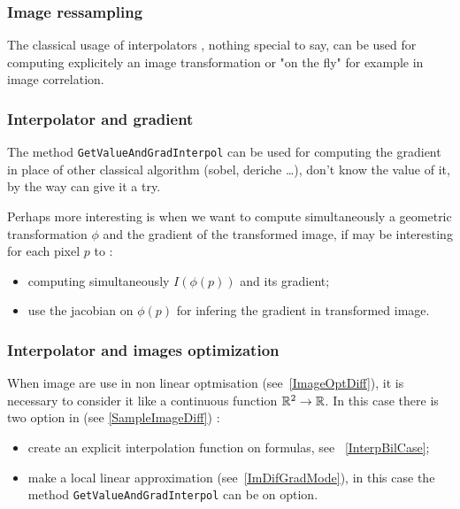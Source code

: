 
\subsubsection{Image ressampling}

The classical usage of interpolators , nothing special to say, can be used for computing explicitely 
an image transformation or "on the fly" for example in image correlation.


\subsubsection{Interpolator and gradient}

The method {\tt GetValueAndGradInterpol} can be used for computing the gradient in place
of other classical algorithm (sobel, deriche \dots), don't know the value of it, by the way
can give it a try.

Perhaps more interesting is when we want to compute simultaneously a geometric transformation $\phi$
and the gradient of the transformed image, if may be interesting for each pixel $p$ to :

\begin{itemize}
   \item computing simultaneously $I(\phi(p))$ and its gradient;
   \item use the jacobian on $\phi(p)$ for infering the gradient in transformed image.
\end{itemize}


\subsubsection{Interpolator and images optimization}

When image are use in non linear optmisation (see~\ref{ImageOptDiff}), it is necessary to consider it like a
continuous function $\mathbb{R}^2 \rightarrow \mathbb{R}$. In this case there is two option in
\PPP (see \ref{SampleImageDiff}) :

\begin{itemize}
     \item  create an explicit interpolation function on formulas, see ~\ref{InterpBilCase};
     \item  make a local linear approximation (see~\ref{ImDifGradMode}), in this case the
            method {\tt GetValueAndGradInterpol} can be on option.
\end{itemize}

